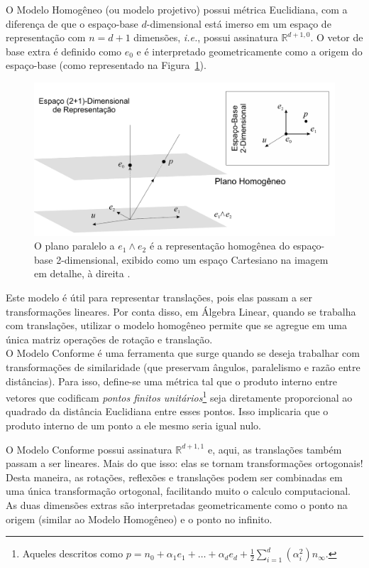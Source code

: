 \documentclass[11pt]{article}
\begin{document}
O Modelo Homogêneo (ou modelo projetivo) possui métrica Euclidiana, com a diferença de que o espaço-base $d$-dimensional está imerso em um espaço de representação com $n = d+1$ dimensões, \textit{i.e.}, possui assinatura $\mathbb{R}^{d+1,0}$. O vetor de base extra é definido como $e_0$ e é interpretado geometricamente como a origem do espaço-base (como representado na Figura~\ref{fig:homogeneo}).

\begin{figure}[H]
	\begin{center}
		\includegraphics[width=0.75\linewidth]{figures/homogeneo.png}
	\end{center}
	\caption{O plano paralelo a $e_1\wedge e_2$ é a representação homogênea do espaço-base 2-dimensional, exibido como um espaço Cartesiano na imagem em detalhe, à direita \cite{leandro2017algebra}.}
	\label{fig:homogeneo}
\end{figure}

Este modelo é útil para representar translações, pois elas passam a ser transformações lineares. Por conta disso, em Álgebra Linear, quando se trabalha com translações, utilizar o modelo homogêneo permite que se agregue em uma única matriz operações de rotação e translação.
\\

O Modelo Conforme é uma ferramenta que surge quando se deseja trabalhar com transformações de similaridade (que preservam ângulos, paralelismo e razão entre distâncias). Para isso, define-se uma métrica tal que o produto interno entre vetores que codificam \textit{pontos finitos unitários}\footnote{Aqueles descritos como $p =n_0 + \alpha_1e_1 + \dots + \alpha_de_d + \frac{1}{2} \sum_{i=1}^{d}(\alpha_i^2)n_\infty$.} seja diretamente proporcional ao quadrado da distância Euclidiana entre esses pontos. Isso implicaria que o produto interno de um ponto a ele mesmo seria igual nulo.

O Modelo Conforme possui assinatura $\mathbb{R}^{d+1,1}$ e, aqui, as translações também passam a ser lineares. Mais do que isso: elas se tornam transformações ortogonais! Desta maneira, as rotações, reflexões e translações podem ser combinadas em uma única transformação ortogonal, facilitando muito o calculo computacional. As duas dimensões extras são interpretadas geometricamente como o ponto na origem (similar ao Modelo Homogêneo) e o ponto no infinito. 
\end{document}
